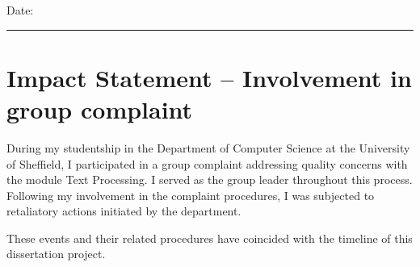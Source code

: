 \documentclass[11pt,oneside]{book}
\begin{document}
\noindent Date:\\[1mm]
\rule[1em]{25em}{0.5pt}

\newpage
\chapter*{\Large Impact Statement – Involvement in group complaint}

During my studentship in the Department of Computer Science at the University of Sheffield, I participated in a group complaint addressing quality concerns with the module Text Processing. I served as the group leader throughout this process. Following my involvement in the complaint procedures, I was subjected to retaliatory actions initiated by the department. 


\bigskip These events and their related procedures have coincided with the timeline of this dissertation project.








\tableofcontents
\listoffigures
\listoftables


\mainmatter






% 

% 


 
 

\begin{appendices}


\end{appendices}
\end{document}
